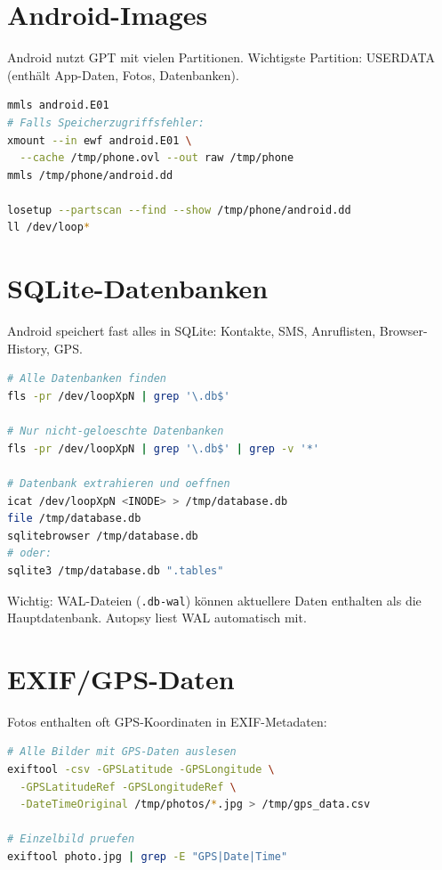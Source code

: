 \section{Android-Images}

Android nutzt GPT mit vielen Partitionen.
Wichtigste Partition: USERDATA (enthält App-Daten, Fotos, Datenbanken).

\begin{lstlisting}[language=bash]
mmls android.E01
# Falls Speicherzugriffsfehler:
xmount --in ewf android.E01 \
  --cache /tmp/phone.ovl --out raw /tmp/phone
mmls /tmp/phone/android.dd

losetup --partscan --find --show /tmp/phone/android.dd
ll /dev/loop*
\end{lstlisting}

\section{SQLite-Datenbanken}

Android speichert fast alles in SQLite: Kontakte, SMS, Anruflisten, Browser-History, GPS.

\begin{lstlisting}[language=bash]
# Alle Datenbanken finden
fls -pr /dev/loopXpN | grep '\.db$'

# Nur nicht-geloeschte Datenbanken
fls -pr /dev/loopXpN | grep '\.db$' | grep -v '*'

# Datenbank extrahieren und oeffnen
icat /dev/loopXpN <INODE> > /tmp/database.db
file /tmp/database.db
sqlitebrowser /tmp/database.db
# oder:
sqlite3 /tmp/database.db ".tables"
\end{lstlisting}

Wichtig: WAL-Dateien (\texttt{.db-wal}) können aktuellere Daten enthalten als die Hauptdatenbank.
Autopsy liest WAL automatisch mit.

\section{EXIF/GPS-Daten}

Fotos enthalten oft GPS-Koordinaten in EXIF-Metadaten:

\begin{lstlisting}[language=bash]
# Alle Bilder mit GPS-Daten auslesen
exiftool -csv -GPSLatitude -GPSLongitude \
  -GPSLatitudeRef -GPSLongitudeRef \
  -DateTimeOriginal /tmp/photos/*.jpg > /tmp/gps_data.csv

# Einzelbild pruefen
exiftool photo.jpg | grep -E "GPS|Date|Time"
\end{lstlisting}

